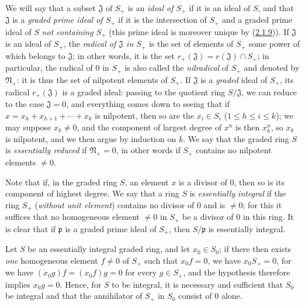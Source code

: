 \begin{env}[2.1.10]
\label{II.2.1.10}
We will say that a subset $\mathfrak{J}$ of $S_+$ is an
\emph{ideal of $S_+$} if it is an ideal of $S$, and that $\mathfrak{J}$ is a
\emph{graded prime ideal of $S_+$} if it is the intersection of $S_+$ and
a graded prime ideal of $S$ \emph{not containing $S_+$} (this prime ideal
is moreover unique by
(\hyperref[II.2.1.9]{2.1.9})). If $\mathfrak{J}$ is an ideal of $S_+$,
the \emph{radical of $\mathfrak{J}$ in $S_+$} is the set of elements of
$S_+$ some power of which belongs to $\mathfrak{J}$; in other words, it is
the set $r_+(\mathfrak{J})=r(\mathfrak{J})\cap S_+$; in particular, the
radical of $0$ in $S_+$ is also called the \emph{nilradical} of $S_+$ and
denoted by $\mathfrak{N}_+$: it is thus the set of nilpotent elements of
$S_+$. If $\mathfrak{J}$ is a \emph{graded} ideal of $S_+$, its radical
$r_+(\mathfrak{J})$ is a graded ideal: passing to the quotient ring
$S/\mathfrak{J}$, we can reduce to the case $\mathfrak{J}=0$, and
everything comes down to seeing that if $x=x_h+x_{h+1}+\cdots+x_k$ is
nilpotent, then so are the $x_i\in S_i$ ($1\leq h\leq i\leq k$); we may
suppose $x_k\neq 0$, and the component of largest degree of $x^n$ is then
$x_k^n$, so $x_k$ is nilpotent, and we then argue by induction on $k$. We
say that the graded ring $S$ is \emph{essentially reduced} if
$\mathfrak{N}_+=0$, in other words if $S_+$ contains no nilpotent elements
$\neq 0$.
\end{env}

\begin{env}[2.1.11]
\label{II.2.1.11}
Note that if, in the graded ring $S$, an element $x$ is a divisor of
$0$, then so is its component of highest degree. We say that a ring $S$ is
\emph{essentially integral} if the ring $S_+$
(\emph{without unit element}) contains no divisor of $0$ and is
$\neq 0$; for this it suffices that no homogeneous element $\neq 0$ in
$S_+$ be a divisor of $0$ in this ring. It is clear that if $\mathfrak{p}$
is a graded prime ideal of $S_+$, then $S/\mathfrak{p}$ is essentially
integral.

Let $S$ be an essentially integral graded ring, and let $x_0\in S_0$;
if there then exists \emph{one} homogeneous element $f\neq 0$ of $S_+$ such
that $x_0f=0$, we have $x_0S_+=0$, for we have $(x_0g)f=(x_0f)g=0$ for
every $g\in S_+$, and the hypothesis therefore implies $x_0g=0$. Hence,
for $S$ to be integral, it is necessary and sufficient that $S_0$ be
integral and that the annihilator of $S_+$ in $S_0$ consist of $0$ alone.
\end{env}

